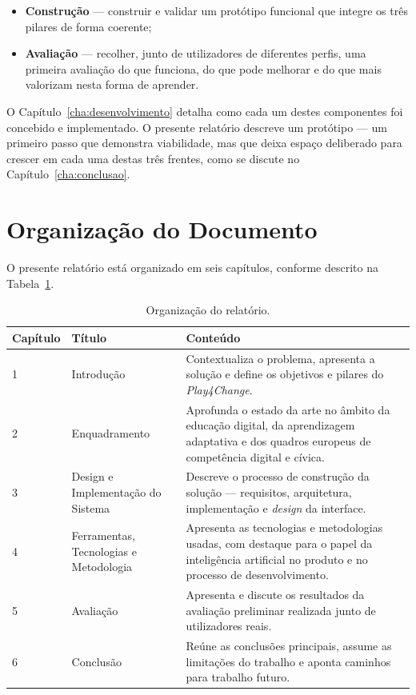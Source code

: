 \begin{itemize}
	\item \textbf{Construção} --- construir e validar um protótipo funcional que integre os três pilares de forma coerente;
	\item \textbf{Avaliação} --- recolher, junto de utilizadores de diferentes perfis, uma primeira avaliação do que funciona, do que pode melhorar e do que mais valorizam nesta forma de aprender.
\end{itemize}

O Capítulo~\ref{cha:desenvolvimento} detalha como cada um destes componentes foi concebido e implementado. O presente relatório descreve um protótipo --- um primeiro passo que demonstra viabilidade, mas que deixa espaço deliberado para crescer em cada uma destas três frentes, como se discute no Capítulo~\ref{cha:conclusao}.

\section{Organização do Documento}
\label{sec:organizacao-documento}

O presente relatório está organizado em seis capítulos, conforme descrito na Tabela~\ref{tab:organizacao}.

\begin{table}[htbp]
\centering
\caption{Organização do relatório.}
\label{tab:organizacao}
\begin{tabularx}{\textwidth}{@{} l l X @{}}
\toprule
\textbf{Capítulo} & \textbf{Título} & \textbf{Conteúdo} \\
\midrule
1 & Introdução & Contextualiza o problema, apresenta a solução e define os objetivos e pilares do \emph{Play4Change}. \\[4pt]
2 & Enquadramento & Aprofunda o estado da arte no âmbito da educação digital, da aprendizagem adaptativa e dos quadros europeus de competência digital e cívica. \\[4pt]
3 & Design e Implementação do Sistema & Descreve o processo de construção da solução --- requisitos, arquitetura, implementação e \emph{design} da interface. \\[4pt]
4 & Ferramentas, Tecnologias e Metodologia & Apresenta as tecnologias e metodologias usadas, com destaque para o papel da inteligência artificial no produto e no processo de desenvolvimento. \\[4pt]
5 & Avaliação & Apresenta e discute os resultados da avaliação preliminar realizada junto de utilizadores reais. \\[4pt]
6 & Conclusão & Reúne as conclusões principais, assume as limitações do trabalho e aponta caminhos para trabalho futuro. \\
\bottomrule
\end{tabularx}
\end{table}
